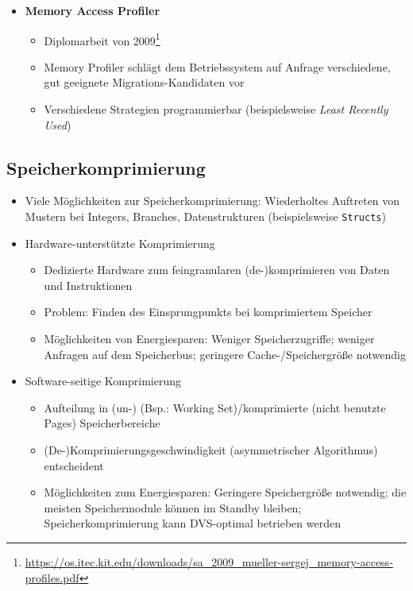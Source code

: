 \begin{itemize}
\begin{itemize}
\begin{itemize}
		\end{itemize}
	\end{itemize}
	\item \textbf{Memory Access Profiler}
	\begin{itemize}
		\item Diplomarbeit von 2009\footnote{\url{https://os.itec.kit.edu/downloads/sa_2009_mueller-sergej_memory-access-profiles.pdf}}
		\item Memory Profiler schlägt dem Betriebssystem auf Anfrage verschiedene, gut geeignete Migrations-Kandidaten vor
		\item Verschiedene Strategien programmierbar (beispielsweise \textit{Least Recently Used})
	\end{itemize}
\end{itemize}


\subsection{Speicherkomprimierung}
\begin{itemize}
	\item Viele Möglichkeiten zur Speicherkomprimierung: Wiederholtes Auftreten von Mustern bei Integers, Branches, Datenstrukturen (beispielsweise \texttt{Structs})
	\item Hardware-unterstützte Komprimierung
	\begin{itemize}
		\item Dedizierte Hardware zum feingranularen (de-)komprimieren von Daten und Instruktionen
		\item Problem: Finden des Einsprungpunkts bei komprimiertem Speicher
		\item Möglichkeiten von Energiesparen: Weniger Speicherzugriffe; weniger Anfragen auf dem Speicherbus; geringere Cache-/Speichergröße notwendig
	\end{itemize}
	\item Software-seitige Komprimierung
	\begin{itemize}
		\item Aufteilung in (un-) (Bsp.: Working Set)/komprimierte (nicht benutzte Pages) Speicherbereiche
		\item (De-)Komprimierungsgeschwindigkeit (asymmetrischer Algorithmus) entscheident
		\item Möglichkeiten zum Energiesparen: Geringere Speichergröße notwendig; die meisten Speichermodule können im Standby bleiben; Speicherkomprimierung kann DVS-optimal betrieben werden
	\end{itemize}
\end{itemize}


